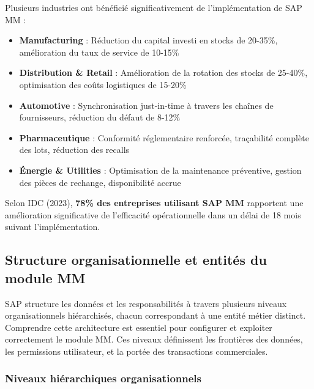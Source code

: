 \documentclass[12pt,a4paper,oneside]{report}
\begin{document}
Plusieurs industries ont bénéficié significativement de l'implémentation de SAP MM :

\begin{itemize}[label=\textbullet, itemsep=0.2em]
	\item \textbf{Manufacturing} : Réduction du capital investi en stocks de 20-35\%, amélioration du taux de service de 10-15\%
	\item \textbf{Distribution \& Retail} : Amélioration de la rotation des stocks de 25-40\%, optimisation des coûts logistiques de 15-20\%
	\item \textbf{Automotive} : Synchronisation just-in-time à travers les chaînes de fournisseurs, réduction du défaut de 8-12\%
	\item \textbf{Pharmaceutique} : Conformité réglementaire renforcée, traçabilité complète des lots, réduction des recalls
	\item \textbf{Énergie \& Utilities} : Optimisation de la maintenance préventive, gestion des pièces de rechange, disponibilité accrue
\end{itemize}

Selon IDC (2023), \textbf{78\% des entreprises utilisant SAP MM} rapportent une amélioration significative 
de l'efficacité opérationnelle dans un délai de 18 mois suivant l'implémentation.

\subsection{Structure organisationnelle et entités du module MM}\label{ch2:mm-organisation}

SAP structure les données et les responsabilités à travers plusieurs niveaux organisationnels hiérarchisés, 
chacun correspondant à une entité métier distinct. Compren­dre cette architecture est essentiel pour configurer 
et exploiter correctement le module MM. Ces niveaux définissent les frontières des données, les permis­sions utilisateur, 
et la portée des transactions commerciales.

\subsubsection{Niveaux hiérarchiques organisationnels}\label{ch2:mm-org-niveaux}
\end{document}
